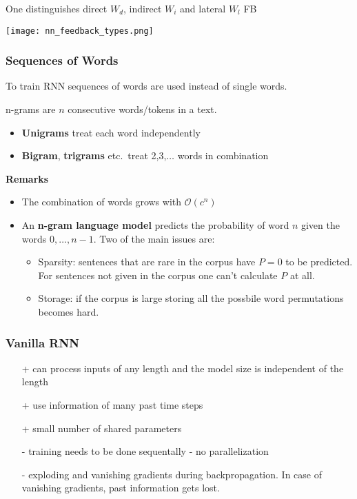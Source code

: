 \newpar{}

One distinguishes direct $W_d$, indirect $W_i$ and lateral $W_l$ FB
\begin{center}
    \texttt{[image: nn\_feedback\_types.png]}
\end{center}

\subsubsection{Sequences of Words}
To train RNN sequences of words are used instead of single words.

n-grams are $n$ consecutive words/tokens in a text.
\begin{itemize}
    \item \textbf{Unigrams} treat each word independently
    \item \textbf{Bigram}, \textbf{trigrams} etc.\ treat 2,3,$\ldots$ words in combination
\end{itemize}
\textbf{Remarks}
\begin{itemize}
    \item The combination of words grows with $\mathcal{O}(c^n)$
    \item An \textbf{n-gram language model} predicts the probability of word $n$ given the words $0,\dots,n-1$. Two of the main issues are:
          \begin{itemize}
              \item Sparsity: sentences that are rare in the corpus have $P=0$ to be predicted. For sentences not given in the corpus one can't calculate $P$ at all.
              \item Storage: if the corpus is large storing all the possbile word permutations becomes hard.
          \end{itemize}
\end{itemize}

\subsubsection{Vanilla RNN}

\begin{itemize}
    \item[+] can process inputs of any length and the model size is independent of the length
    \item[+] use information of many past time steps
    \item[+] small number of shared parameters
    \item[-] training needs to be done sequentally - no parallelization
    \item[-] exploding and vanishing gradients during backpropagation. In case of vanishing gradients, past information gets lost.
\end{itemize}

